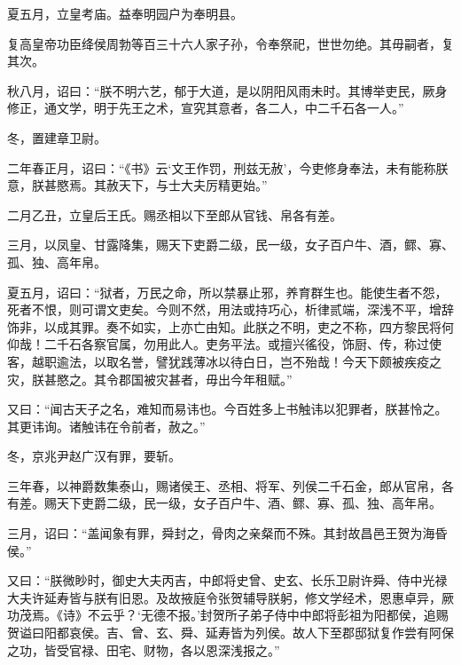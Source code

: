 \documentclass[12pt,UTF8]{ctexbook}
\begin{document}
夏五月，立皇考庙。益奉明园户为奉明县。



复高皇帝功臣绛侯周勃等百三十六人家子孙，令奉祭祀，世世勿绝。其毋嗣者，复其次。



秋八月，诏曰：“朕不明六艺，郁于大道，是以阴阳风雨未时。其博举吏民，厥身修正，通文学，明于先王之术，宣究其意者，各二人，中二千石各一人。”



冬，置建章卫尉。



二年春正月，诏曰：“《书》云‘文王作罚，刑兹无赦’，今吏修身奉法，未有能称朕意，朕甚愍焉。其赦天下，与士大夫厉精更始。”



二月乙丑，立皇后王氏。赐丞相以下至郎从官钱、帛各有差。



三月，以凤皇、甘露降集，赐天下吏爵二级，民一级，女子百户牛、酒，鳏、寡、孤、独、高年帛。



夏五月，诏曰：“狱者，万民之命，所以禁暴止邪，养育群生也。能使生者不怨，死者不恨，则可谓文吏矣。今则不然，用法或持巧心，析律贰端，深浅不平，增辞饰非，以成其罪。奏不如实，上亦亡由知。此朕之不明，吏之不称，四方黎民将何仰哉！二千石各察官属，勿用此人。吏务平法。或擅兴徭役，饰厨、传，称过使客，越职逾法，以取名誉，譬犹践薄冰以待白日，岂不殆哉！今天下颇被疾疫之灾，朕甚愍之。其令郡国被灾甚者，毋出今年租赋。”



又曰：“闻古天子之名，难知而易讳也。今百姓多上书触讳以犯罪者，朕甚怜之。其更讳询。诸触讳在令前者，赦之。”



冬，京兆尹赵广汉有罪，要斩。



三年春，以神爵数集泰山，赐诸侯王、丞相、将军、列侯二千石金，郎从官帛，各有差。赐天下吏爵二级，民一级，女子百户牛、酒、鳏、寡、孤、独、高年帛。



三月，诏曰：“盖闻象有罪，舜封之，骨肉之亲粲而不殊。其封故昌邑王贺为海昏侯。”



又曰：“朕微眇时，御史大夫丙吉，中郎将史曾、史玄、长乐卫尉许舜、侍中光禄大夫许延寿皆与朕有旧恩。及故掖庭令张贺辅导朕躬，修文学经术，恩惠卓异，厥功茂焉。《诗》不云乎？‘无德不报。’封贺所子弟子侍中中郎将彭祖为阳都侯，追赐贺谥曰阳都哀侯。吉、曾、玄、舜、延寿皆为列侯。故人下至郡邸狱复作尝有阿保之功，皆受官禄、田宅、财物，各以恩深浅报之。”
\end{document}

